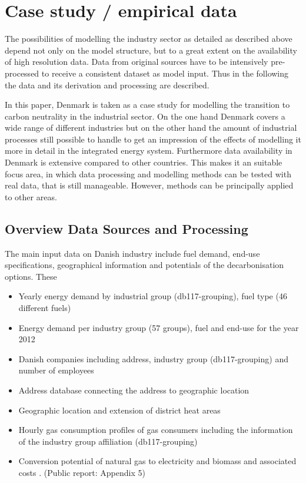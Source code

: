 \documentclass[review]{elsarticle}
\begin{document}
\section{Case study / empirical data} \label{datadescr}


The possibilities of modelling the industry sector as detailed as described above depend not only on the model structure, but to a great extent on the availability of high resolution data. Data from original sources have to be intensively pre-processed to receive a consistent dataset as model input. Thus in the following the data and its derivation and processing are described.

In this paper, Denmark is taken as a case study for modelling the transition to carbon neutrality in the industrial sector. On the one hand Denmark covers a wide range of different industries but on the other hand the amount of industrial processes still possible to handle to get an impression of the effects of modelling it more in detail in the integrated energy system. Furthermore data availability in Denmark is extensive compared to other countries. This makes it an suitable focus area, in which data processing and modelling methods can be tested with real data, that is still manageable. However, methods can be principally applied to other areas.

\subsection{Overview Data Sources and Processing}
\label{sec:overview_data}
The main input data on Danish industry include fuel demand, end-use specifications, geographical information and potentials of the decarbonisation options. These
\begin{itemize}
 \item Yearly energy demand by industrial group (db117-grouping), fuel type (46 different fuels) \cite{StatisticsDenmark2017}
 \item Energy demand per industry group (57 groups), fuel and end-use for the year 2012 \cite{VM2015} 
 \item Danish companies including address, industry group (db117-grouping) and number of employees \cite{virk2017}
 \item Address database connecting the address to geographic location \cite{aws2017}
 \item Geographic location and extension of district heat areas \cite{kortforsyningen2017}
 \item Hourly gas consumption profiles of gas consumers including the information of the industry group affiliation (db117-grouping) \cite{DanskGasDistribution2016}
 \item Conversion potential of natural gas to electricity and biomass \cite{DGC2013a} and associated costs \cite{DGC2013b}. (Public report: \cite{ENS2014} Appendix 5)
\end{itemize}
\end{document}
